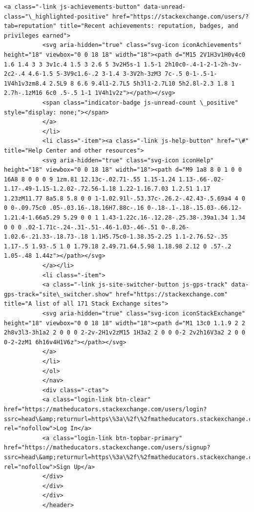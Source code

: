 \documentclass[11pt]{article}
\begin{document}
\begin{Verbatim}[commandchars=\\\{\}]
           <a class="-link js-achievements-button" data-unread-class="\_highlighted-positive" href="https://stackexchange.com/users/?tab=reputation" title="Recent achievements: reputation, badges, and privileges earned">
           <svg aria-hidden="true" class="svg-icon iconAchievements" height="18" viewbox="0 0 18 18" width="18"><path d="M15 2V1H3v1H0v4c0 1.6 1.4 3 3 3v1c.4 1.5 3 2.6 5 3v2H5s-1 1.5-1 2h10c0-.4-1-2-1-2h-3v-2c2-.4 4.6-1.5 5-3V9c1.6-.2 3-1.4 3-3V2h-3zM3 7c-.5 0-1-.5-1-1V4h1v3zm8.4 2.5L9 8 6.6 9.4l1-2.7L5 5h3l1-2.7L10 5h2.8l-2.3 1.8 1 2.7h-.1zM16 6c0 .5-.5 1-1 1V4h1v2z"></path></svg>
           <span class="indicator-badge js-unread-count \_positive" style="display: none;"></span>
           </a>
           </li>
           <li class="-item"><a class="-link js-help-button" href="\#" title="Help Center and other resources">
           <svg aria-hidden="true" class="svg-icon iconHelp" height="18" viewbox="0 0 18 18" width="18"><path d="M9 1a8 8 0 1 0 0 16A8 8 0 0 0 9 1zm.81 12.13c-.02.71-.55 1.15-1.24 1.13-.66-.02-1.17-.49-1.15-1.2.02-.72.56-1.18 1.22-1.16.7.03 1.2.51 1.17 1.23zM11.77 8a5.8 5.8 0 0 1-1.02.91l-.53.37c-.26.2-.42.43-.5.69a4 4 0 0 0-.09.75c0 .05-.03.16-.18.16H7.88c-.16 0-.18-.1-.18-.15.03-.66.12-1.21.4-1.66a5.29 5.29 0 0 1 1.43-1.22c.16-.12.28-.25.38-.39a1.34 1.34 0 0 0 .02-1.71c-.24-.31-.51-.46-1.03-.46-.51 0-.8.26-1.02.6-.21.33-.18.73-.18 1.1H5.75c0-1.38.35-2.25 1.1-2.76.52-.35 1.17-.5 1.93-.5 1 0 1.79.18 2.49.71.64.5.98 1.18.98 2.12 0 .57-.2 1.05-.48 1.44z"></path></svg>
           </a></li>
           <li class="-item">
           <a class="-link js-site-switcher-button js-gps-track" data-gps-track="site\_switcher.show" href="https://stackexchange.com" title="A list of all 171 Stack Exchange sites">
           <svg aria-hidden="true" class="svg-icon iconStackExchange" height="18" viewbox="0 0 18 18" width="18"><path d="M1 13c0 1.1.9 2 2 2h8v3l3-3h1a2 2 0 0 0 2-2v-2H1v2zM15 1H3a2 2 0 0 0-2 2v2h16V3a2 2 0 0 0-2-2zM1 6h16v4H1V6z"></path></svg>
           </a>
           </li>
           </ol>
           </nav>
           <div class="-ctas">
           <a class="login-link btn-clear" href="https://matheducators.stackexchange.com/users/login?ssrc=head\&amp;returnurl=https\%3a\%2f\%2fmatheducators.stackexchange.com\%2f" rel="nofollow">Log In</a>
           <a class="login-link btn-topbar-primary" href="https://matheducators.stackexchange.com/users/signup?ssrc=head\&amp;returnurl=https\%3a\%2f\%2fmatheducators.stackexchange.com\%2f" rel="nofollow">Sign Up</a>
           </div>
           </div>
           </div>
           </header>

\end{Verbatim}
\end{document}
